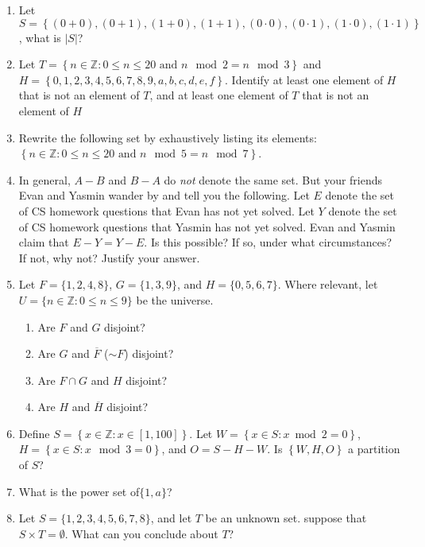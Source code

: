 \documentclass[11pt, oneside]{article}   	%
\begin{document}
\begin{enumerate}
\item Let $S=\left\{\left(0+0\right), \left(0+1\right), \left(1+0\right), \left(1+1\right), \left(0\cdot0\right), \left(0\cdot1\right), \left(1\cdot0\right), \left(1\cdot1\right)\right\} $, what is $|S|$?
\item Let $T = \left\{n \in\mathbb{Z} : 0\le n \le 20 \text{ and } n \mod 2 = n \mod 3\right\}$ 
and \\$H = \left\{0,1,2,3,4,5,6,7,8,9,a,b,c,d,e,f\right\}$. 
Identify at least one element of $H$ that is not an element of $T$, and 
at least one element of $T$ that is not an element of $H$
\item Rewrite the following set by exhaustively listing its elements: \\$\left\{n\in\mathbb{Z} :0\le n\le 20 \text{ and } n\mod5=n\mod7\right\}$.
\item In general, $A-B$ and $B-A$ do \textit{not} denote the same set.
But your friends Evan and Yasmin wander by and tell you the following. 
Let $E$ denote the set of CS homework questions that Evan has not yet solved. 
Let $Y$ denote the set of CS homework questions that Yasmin has not yet solved. 
Evan and Yasmin claim that $E-Y = Y-E$. 
Is this possible? If so, under what circumstances? If not, why not? Justify your answer.

\item Let $F = \{1,2,4,8\}$, $G = \{1,3,9\}$, and $H = \{0,5,6,7\}$. 
Where relevant, let \\$U = \{n\in\mathbb{Z} :0\le n\le 9\}$ be the universe.
\begin{enumerate}
\item Are $F$ and $G$ disjoint?
\item Are $G$ and $\overline F$ ($\sim F$) disjoint?
\item Are $F\cap G$ and $H$ disjoint?
\item Are $H$ and $\overline H$ disjoint?
\end{enumerate}


\item Define $S=\left\{x\in \mathbb{Z}: x \in \left[1,100\right]\right\}$.
Let $W=\left\{x \in S: x \bmod 2 = 0\right\}$, $H=\left\{x \in S:x \mod 3=0\right\}$, and $O=S-H-W$.
Is $\left\{W,H,O\right\}$ a partition of $S$?
\item What is the power set of$\{1,a\}$?
\item Let $S = \{1,2,3,4,5,6,7,8\}$, and let $T$ be an unknown set.
suppose that $S\times T=\emptyset$.
What can you conclude about $T$?
\end{enumerate}
\end{document}
